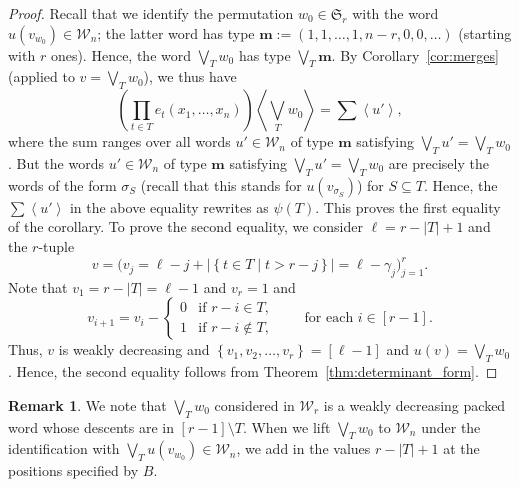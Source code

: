 \documentclass[reqno]{amsart}
\newcommand{\0}{\phantom{c}}
\newcommand{\swt}[1]{\left\langle #1 \right\rangle} %
\newcommand{\SymGp}[1]{\mathfrak{S}_{#1}} %
\newcommand{\mm}{\mathbf{m}}
\newcommand{\mcW}{\mathcal{W}}
\let\sumnonlimits\sum
\let\prodnonlimits\prod
\renewcommand{\sum}{\sumnonlimits\limits}
\renewcommand{\prod}{\prodnonlimits\limits}
\newenvironment{verlong}{}{}
\newcommand{\set}[1]{\left\{ #1 \right\}}
\newcommand{\abs}[1]{\left| #1 \right|}
\newcommand{\tup}[1]{\left( #1 \right)}
\newcommand{\ive}[1]{\left[ #1 \right]}
\theoremstyle{plain}
\theoremstyle{definition}
\newtheorem{remark}[thm]{Remark}
\numberwithin{equation}{section}
\begin{document}
\begin{proof}
Recall that we identify the permutation $w_0 \in \SymGp{r}$ with the word $u(v_{w_0}) \in \mcW_n$;
the latter word has type
$\mm := \tup{1,1,\ldots,1,n-r,0,0,\ldots}$ (starting with $r$
ones).
Hence, the word $\bigvee_T w_0$ has type $\bigvee_T \mm$.
By Corollary~\ref{cor:merges} (applied to $v = \bigvee_T w_0$), we thus have
\[
\left(\prod_{t \in T} e_t(x_1, \dotsc, x_n) \right) \swt{ \bigvee_T w_0} = \sum \swt{u'} ,
\]
where the sum ranges over all words $u' \in \mcW_n$
of type $\mm$ satisfying
$\bigvee_T u' = \bigvee_T w_0$.
But the words $u' \in \mcW_n$ of type $\mm$ satisfying
$\bigvee_T u' = \bigvee_T w_0$ are precisely the words of the form $\sigma_S$
\begin{verlong}
(recall that this stands for $u(v_{\sigma_S})$)
\end{verlong}
for $S \subseteq T$.
Hence, the $\sum \swt{u'}$ in the above equality rewrites as $\psi(T)$.
This proves the first equality of the corollary.
To prove the second equality, we consider $\ell = r - \abs{T} + 1$ and
the $r$-tuple
\[
v = \bigl(v_j = \ell - j + \abs{\set{t \in T \mid t > r-j}} = \ell - \gamma_j \bigr)_{j=1}^r.
\]
Note that $v_1 = r - \abs{T} = \ell-1$ and $v_r = 1$ and
\[
v_{i+1} = v_i - \begin{cases} 0 & \text{if } r-i \in T, \\ 1 & \text{if } r-i \notin T, \end{cases}
\qquad
\text{for each $i \in \ive{r-1}$.}
\]
Thus, $v$ is weakly decreasing and $\set{v_1, v_2, \ldots, v_r} = \ive{\ell-1}$ and $u(v) = \bigvee_T w_0$.
Hence, the second equality follows from Theorem~\ref{thm:determinant_form}.
\end{proof}

\begin{remark}
We note that $\bigvee_T w_0$ considered in $\mcW_r$ is a weakly decreasing packed word whose descents are in $[r-1] \setminus T$.
When we lift $\bigvee_T w_0$ to $\mcW_n$ under the identification with $\bigvee_T u(v_{w_0}) \in \mcW_n$, we add in the values $r-\abs{T}+1$ at the positions specified by $B$.
\end{remark}
\end{document}
